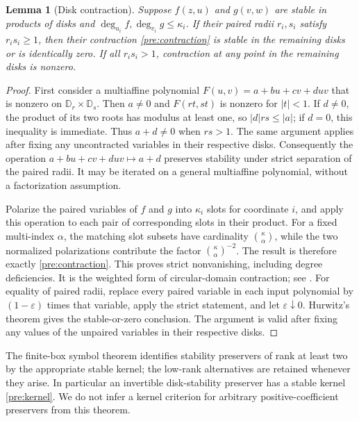 \documentclass[reqno]{amsart}
\newtheorem{lemma}[theorem]{Lemma}
\theoremstyle{definition}
\theoremstyle{remark}
\newcommand{\D}{\mathbb D}
\begin{document}
\begin{lemma}[Disk contraction]\label{pre:grace}
Suppose $f(z,u)$ and $g(v,w)$ are stable in products of disks and
$\deg_{u_i}f,\deg_{v_i}g\leq\kappa_i$. If their paired radii
$r_i,s_i$ satisfy $r_is_i\geq1$, then their contraction
\eqref{pre:contraction} is stable in the remaining disks or is identically
zero. If all $r_is_i>1$, contraction at any point in the remaining
disks is nonzero.
\end{lemma}
\begin{proof}
First consider a multiaffine polynomial
$F(u,v)=a+bu+cv+duv$ that is nonzero on $\D_r\times\D_s$.
Then $a\ne0$ and $F(rt,st)$ is nonzero for $|t|<1$.
If $d\ne0$, the product of its two roots has modulus at least one,
so $|d|rs\le|a|$; if $d=0$, this inequality is immediate.
Thus $a+d\ne0$ when $rs>1$.
The same argument applies after fixing any uncontracted variables
in their respective disks. Consequently the operation
$a+bu+cv+duv\mapsto a+d$ preserves stability under strict
separation of the paired radii. It may be iterated on a general
multiaffine polynomial, without a factorization assumption.

Polarize the paired variables of $f$ and $g$ into $\kappa_i$
slots for coordinate $i$, and apply this operation to each pair
of corresponding slots in their product.
For a fixed multi-index $\alpha$, the matching slot subsets have
cardinality $\binom{\kappa}{\alpha}$, while the two normalized
polarizations contribute the factor
$\binom{\kappa}{\alpha}^{-2}$.
The result is therefore exactly \eqref{pre:contraction}.
This proves strict nonvanishing, including degree deficiencies.
It is the weighted form of circular-domain contraction;
see \cite{AsanoJapanese70,BB09,BB10II}.
For equality of paired radii, replace every paired variable in each input
polynomial by $(1-\varepsilon)$ times that variable, apply the strict
statement, and let $\varepsilon\downarrow0$. Hurwitz's theorem gives
the stable-or-zero conclusion. The argument is valid after fixing
any values of the unpaired variables in their respective disks.
\end{proof}

The finite-box symbol theorem \cite{BB09,BB10II} identifies stability
preservers of rank at least two by the appropriate stable kernel;
the low-rank alternatives are retained whenever they arise.
In particular an invertible disk-stability preserver has a stable
kernel \eqref{pre:kernel}. We do not infer a kernel criterion for
arbitrary positive-coefficient preservers from this theorem.
\end{document}
